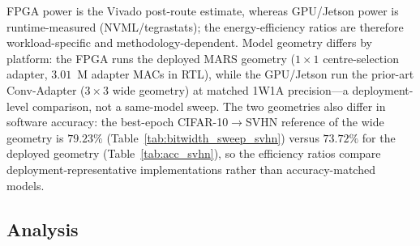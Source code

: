 \documentclass[12pt, a4paper]{report}
\numberwithin{equation}{chapter}
\numberwithin{figure}{chapter}
\numberwithin{table}{chapter}
\numberwithin{algorithm}{chapter}
\begin{document}
\begin{table}[H]
\centering
\caption{Deployment-Level Comparison under Matched Dataset, Precision, Input Size, and Batch Protocol but Different Adapter Geometries: MARS (FPGA) vs.\ Conv-Adapter~\cite{Chen2024ConvAdapter} (GPU/Jetson), SVHN, Batch 1000.}
\label{tab:platform_adapter}
\begin{flushleft}
\footnotesize FPGA power is the Vivado post-route estimate, whereas GPU/Jetson power is runtime-measured (NVML/tegrastats); the energy-efficiency ratios are therefore workload-specific and methodology-dependent. Model geometry differs by platform: the FPGA runs the deployed MARS geometry ($1{\times}1$ centre-selection adapter, $3.01$~M adapter MACs in RTL), while the GPU/Jetson run the prior-art Conv-Adapter ($3{\times}3$ wide geometry) at matched 1W1A precision---a deployment-level comparison, not a same-model sweep. The two geometries also differ in software accuracy: the best-epoch CIFAR-10$\to$SVHN reference of the wide geometry is $79.23\%$ (Table~\ref{tab:bitwidth_sweep_svhn}) versus $73.72\%$ for the deployed geometry (Table~\ref{tab:acc_svhn}), so the efficiency ratios compare deployment-representative implementations rather than accuracy-matched models.
\end{flushleft}
\end{table}

\subsection{Analysis}
\end{document}

